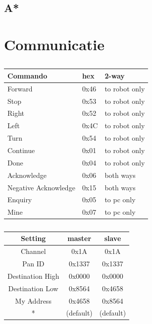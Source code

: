 \documentclass{report}
\begin{document}
\subsection{A*}
\label{ssec:pseudocode-astar}
\cite{pseudocode-astar}

\newpage
\section{Communicatie}
\label{sec:communicatie}
\begin{table}[H]
\centering
\caption{}
\begin{subtable}{0.48\textwidth}
\label{tab:comProtocol}
\centering
\begin{tabular}{@{}lll@{}}
\toprule
\textbf{Commando} & \textbf{hex} & \textbf{2-way} \\
\midrule
Forward				& 0x46 	& to robot only\\
Stop 					& 0x53 	& to robot only\\
Right 					& 0x52 	& to robot only\\
Left 					& 0x4C 	& to robot only\\
Turn					& 0x54 	& to robot only\\
Continue				& 0x01	& to robot only\\
Done 					& 0x04	& to robot only\\
Acknowledge 			& 0x06	& both ways\\
Negative Acknowledge 		& 0x15	& both ways \\
Enquiry 				& 0x05	& to pc only\\
Mine 					& 0x07	& to pc only\\
\bottomrule
\end{tabular}
\end{subtable}
\quad
\begin{subtable}{0.48\textwidth}
\label{tab:xBeeSettings}
\centering
\begin{tabular}{@{}ccc@{}}
\toprule
\textbf{Setting} & \textbf{master}& \textbf{slave} \\
\midrule
Channel				& 0x1A 	& 0x1A\\
Pan ID				& 0x1337 	& 0x1337\\
Destination High			& 0x0000	& 0x0000\\
Destination Low			& 0x8564 	& 0x4658\\
My Address				& 0x4658 	& 0x8564\\
*		 			& (default)	&(default)\\
\bottomrule
\end{tabular}
\end{subtable}
\end{table}
\end{document}
